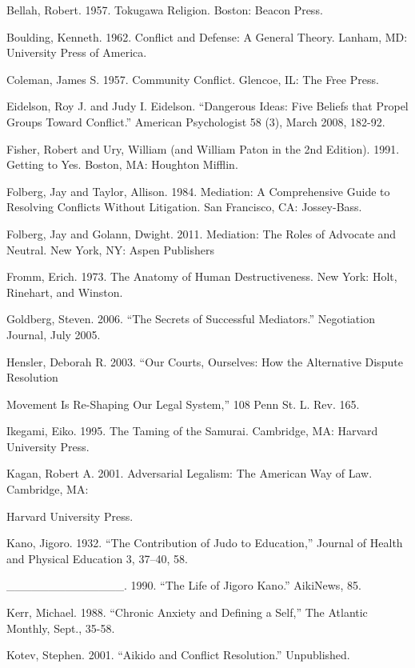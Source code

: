 \begin{list}{}{}
\item Bellah, Robert. 1957. Tokugawa Religion. Boston: Beacon Press.
\item Boulding, Kenneth. 1962. Conflict and Defense: A General Theory. Lanham, MD: University Press of America. 
\item Coleman, James S. 1957. Community Conflict. Glencoe, IL: The Free Press.
\item Eidelson, Roy J. and Judy I. Eidelson. ``Dangerous Ideas: Five Beliefs that Propel Groups Toward Conflict.'' American Psychologist 58 (3), March 2008, 182-92.
\item Fisher, Robert and Ury, William (and William Paton in the 2nd Edition). 1991. Getting to Yes. Boston, MA: Houghton Mifflin.
\item Folberg, Jay and Taylor, Allison. 1984. Mediation: A Comprehensive Guide to Resolving Conflicts Without Litigation. San Francisco, CA: Jossey-Bass.
\item Folberg, Jay and Golann, Dwight. 2011. Mediation: The Roles of Advocate and Neutral. New York, NY: Aspen Publishers
\item Fromm, Erich. 1973. The Anatomy of Human Destructiveness. New York: Holt, Rinehart, and Winston.
\item Goldberg, Steven. 2006. ``The Secrets of Successful Mediators.'' Negotiation Journal, July 2005.
\item Hensler, Deborah R. 2003. ``Our Courts, Ourselves: How the Alternative Dispute Resolution 
\item Movement Is Re-Shaping Our Legal System,'' 108 Penn St. L. Rev. 165.
\item Ikegami, Eiko. 1995. The Taming of the Samurai. Cambridge, MA: Harvard University Press.
\item Kagan, Robert A. 2001. Adversarial Legalism: The American Way of Law. Cambridge, MA: 
\item Harvard University Press.
\item Kano, Jigoro. 1932. ``The Contribution of Judo to Education,'' Journal of Health and Physical Education 3, 37--40, 58.
\item \_\_\_\_\_\_\_\_\_\_\_\_\_\_. 1990. ``The Life of Jigoro Kano.'' AikiNews, 85.
\item Kerr, Michael. 1988. ``Chronic Anxiety and Defining a Self,'' The Atlantic Monthly, Sept., 35-58.
\item Kotev, Stephen. 2001. ``Aikido and Conflict Resolution.'' Unpublished.

\end{list}
